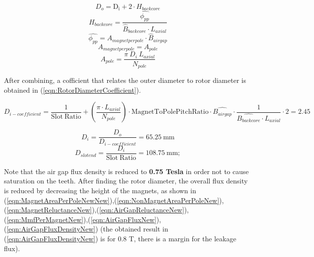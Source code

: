 \documentclass{article}
\begin{document}
\begin{equation} \label{eqn:StatorOuterDiameterNew}
    D_{o} = \mathrm{D_{i}} + 2\cdot H_{backcore}
\end{equation}
\begin{equation} \label{eqn:BackCoreDepthNew}
    H_{backcore} = \frac{\hat{\phi_{pp}}}{\hat{B}_{backcore} \cdot L_{axial}} 
\end{equation}
\begin{equation} \label{eqn:FluxPerPoleNew}
    \hat{\phi_{pp}} = A_{magnetperpole}\cdot \hat{B}_{airgap}
\end{equation}
\begin{equation} \label{eqn:MagnetAreaPerPoleNew}
    A_{magnetperpole} = A_{pole} 
\end{equation}
\begin{equation} \label{eqn:PoleAreaNew}
    A_{pole} = \frac{\pi \: D_i \: L_{axial}}{N_{pole}}
\end{equation}

After combining, a cofficient that relates the outer diameter to rotor diameter is obtained in (\ref{eqn:RotorDiameterCoefficient}).

\begin{equation} \label{eqn:RotorDiameterCoefficient}
    D_{i-coefficient} = \frac{1}{\mathrm{Slot \: Ratio}} + (\frac{\pi \cdot L_{axial}}{N_{pole}})\cdot \mathrm{MagnetToPolePitchRatio} \cdot \hat{B_{airgap}}\cdot \frac{1}{\hat{B_{backcore}}\cdot L_{axial}}\cdot 2 = 2.45
\end{equation}

\begin{equation} \label{eqn:RotorDiameterNew}
    D_{i} = \frac{D_o}{D_{i-coefficient}} = 65.25 \: \mathrm{mm}
\end{equation}
\begin{equation} \label{eqn:SlotEndDiameterNew}
    D_{slotend} = \frac{D_i}{\mathrm{Slot \: Ratio}} = 108.75 \: \mathrm{mm};
\end{equation}


Note that the air gap flux density is reduced to \textbf{0.75 Tesla} in order not to cause saturation on the teeth. After finding the rotor diameter, the overall flux density is reduced by decreasing the height of the magnets, as shown in (\ref{eqn:MagnetAreaPerPoleNewNew}),(\ref{eqn:NonMagnetAreaPerPoleNew}),(\ref{eqn:MagnetReluctanceNew}),(\ref{eqn:AirGapReluctanceNew}),(\ref{eqn:MmfPerMagnetNew}),(\ref{eqn:AirGapFluxNew}),(\ref{eqn:AirGapFluxDensityNew}) (the obtained result in (\ref{eqn:AirGapFluxDensityNew}) is for 0.8 T, there is a margin for the leakage flux).
\end{document}

